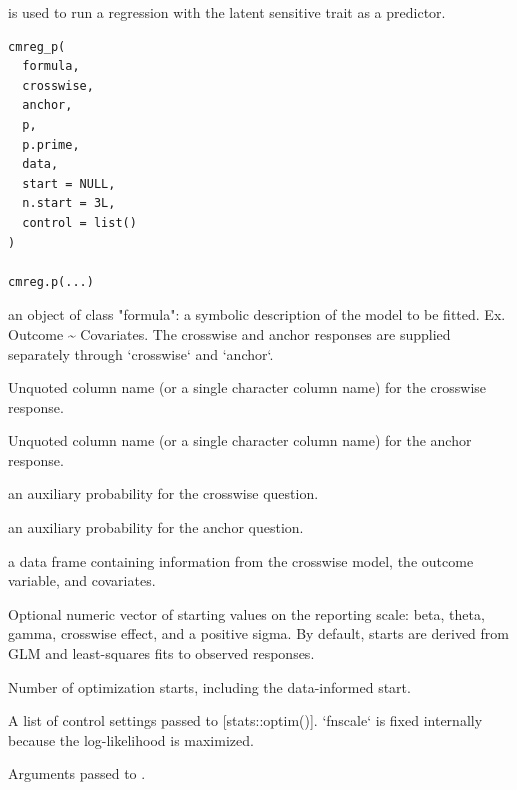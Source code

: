 \documentclass[a4paper]{book}
\begin{document}
%
\begin{Description}
 is used to run a regression with the latent sensitive trait as a predictor.
\end{Description}
%
\begin{Usage}
\begin{verbatim}
cmreg_p(
  formula,
  crosswise,
  anchor,
  p,
  p.prime,
  data,
  start = NULL,
  n.start = 3L,
  control = list()
)

cmreg.p(...)
\end{verbatim}
\end{Usage}
%
\begin{Arguments}
\begin{ldescription}
\item[\code{formula}] an object of class "formula":
a symbolic description of the model to be fitted.
Ex. Outcome \textasciitilde{} Covariates. The crosswise and anchor responses are supplied
separately through `crosswise` and `anchor`.

\item[\code{crosswise}] Unquoted column name (or a single character column name) for
the crosswise response.

\item[\code{anchor}] Unquoted column name (or a single character column name) for the
anchor response.

\item[\code{p}] an auxiliary probability for the crosswise question.

\item[\code{p.prime}] an auxiliary probability for the anchor question.

\item[\code{data}] a data frame containing information from the crosswise model, the outcome variable, and covariates.

\item[\code{start}] Optional numeric vector of starting values on the reporting scale:
beta, theta, gamma, crosswise effect, and a positive sigma. By default, starts
are derived from GLM and least-squares fits to observed responses.

\item[\code{n.start}] Number of optimization starts, including the data-informed start.

\item[\code{control}] A list of control settings passed to [stats::optim()]. `fnscale`
is fixed internally because the log-likelihood is maximized.

\item[\code{...}] Arguments passed to .
\end{ldescription}
\end{Arguments}
\end{document}
